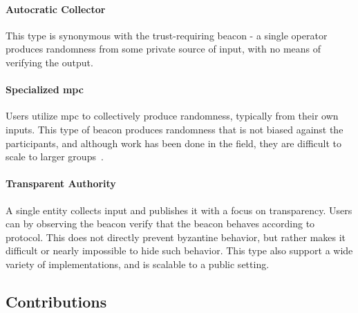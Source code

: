 \paragraph{Autocratic Collector} This type is synonymous with the trust-requiring beacon - a single operator produces randomness from some private source of input, with no means of verifying the output.

\paragraph{Specialized \acrshort{mpc}} Users utilize \acrfull{mpc} to collectively produce randomness, typically from their own inputs. This type of beacon produces randomness that is not biased against the participants, and although work has been done in the field, they are difficult to scale to larger groups~\cite{cascudo2017scrape, syta2017scalable}.

\paragraph{Transparent Authority} A single entity collects input and publishes it with a focus on transparency. Users can by observing the beacon verify that the beacon behaves according to protocol. This does not directly prevent byzantine behavior, but rather makes it difficult or nearly impossible to hide such behavior. This type also support a wide variety of implementations, and is scalable to a public setting.

\subsection{Contributions}
